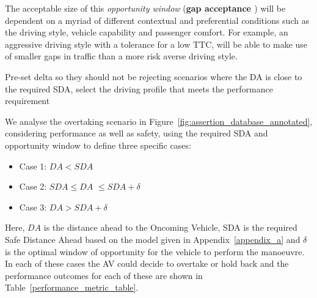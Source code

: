%
%
The acceptable size of this \emph{opportunity window} (\textbf{gap acceptance \cite{mahmassani1981using}}) will be dependent on a myriad of different contextual and preferential conditions such as the driving style, vehicle capability and passenger comfort. For example, an aggressive driving style with a tolerance for a low TTC, will be able to make use of smaller gaps in traffic than a more risk averse driving style. 

Pre-set delta so they should not be rejecting scenarios where the DA is close to the required SDA, select the driving profile that meets the performance requirement

We analyse the overtaking scenario in Figure~\ref{fig:assertion_database_annotated}, considering performance as well as safety, using the required SDA and opportunity window to define three specific cases:
\begin{itemize}

    \item Case 1: $DA < SDA$
    \item Case 2: $SDA \leq DA$ $\leq SDA + \delta$
    \item Case 3: $DA > SDA + \delta$
\end{itemize}
%
Here, $DA$ is the distance ahead to the Oncoming Vehicle,
SDA is the required Safe Distance Ahead based on the model given in Appendix~\ref{appendix_a} and $\delta$ is the optimal window of opportunity for the vehicle to perform the manoeuvre. 
%
In each of these cases the AV could decide to overtake or hold back and the performance outcomes for each of these are shown in Table~\ref{performance_metric_table}. 
%
